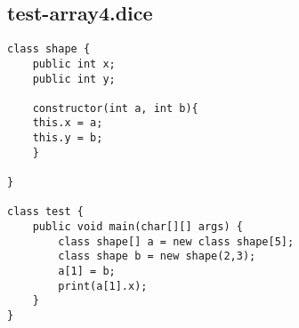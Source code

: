 \subsection{test-array4.dice}
\begin{verbatim}
class shape {
	public int x;
	public int y;

	constructor(int a, int b){
	this.x = a;
	this.y = b;
	}

}

class test {
	public void main(char[][] args) {
		class shape[] a = new class shape[5];
		class shape b = new shape(2,3);
		a[1] = b;
		print(a[1].x);
	}
}

\end{verbatim}